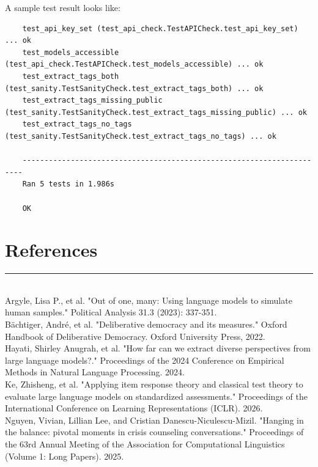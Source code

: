 \documentclass[titlepage]{article}
\begin{document}
A sample test result looks like:
\begin{sidequote}
    \begin{verbatim}
    test_api_key_set (test_api_check.TestAPICheck.test_api_key_set) ... ok
    test_models_accessible (test_api_check.TestAPICheck.test_models_accessible) ... ok
    test_extract_tags_both (test_sanity.TestSanityCheck.test_extract_tags_both) ... ok
    test_extract_tags_missing_public (test_sanity.TestSanityCheck.test_extract_tags_missing_public) ... ok
    test_extract_tags_no_tags (test_sanity.TestSanityCheck.test_extract_tags_no_tags) ... ok
    
    ----------------------------------------------------------------------
    Ran 5 tests in 1.986s
    
    OK
    \end{verbatim}
\end{sidequote}

\newpage

\section{References}
\label{sec:taskdescription}
\rule{\textwidth}{0.4pt}\\

Argyle, Lisa P., et al. "Out of one, many: Using language models to simulate human samples." Political Analysis 31.3 (2023): 337-351.\\

Bächtiger, André, et al. "Deliberative democracy and its measures." Oxford Handbook of Deliberative Democracy. Oxford University Press, 2022.\\

Hayati, Shirley Anugrah, et al. "How far can we extract diverse perspectives from large language models?." Proceedings of the 2024 Conference on Empirical Methods in Natural Language Processing. 2024.\\

Ke, Zhisheng, et al. "Applying item response theory and classical test theory to evaluate large language models on standardized assessments." Proceedings of the International Conference on Learning Representations (ICLR). 2026.\\

Nguyen, Vivian, Lillian Lee, and Cristian Danescu-Niculescu-Mizil. "Hanging in the balance: pivotal moments in crisis counseling conversations." Proceedings of the 63rd Annual Meeting of the Association for Computational Linguistics (Volume 1: Long Papers). 2025.\\
\end{document}
